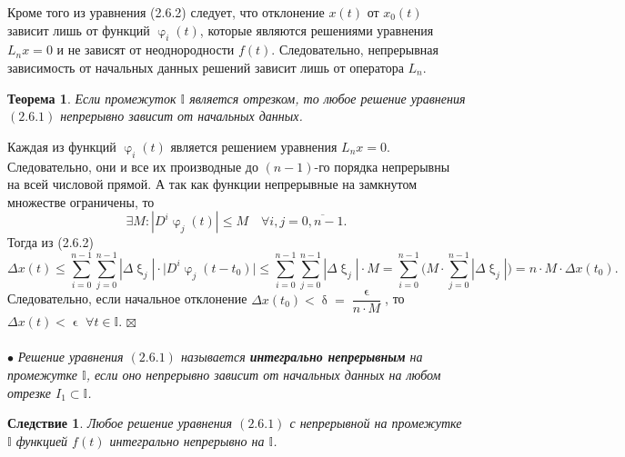 \documentclass[a4paper, 12pt]{report}
\newenvironment{Proof} %
{\par\noindent{$\blacklozenge$}} %
{\hfill$\scriptstyle\boxtimes$}
\newcommand{\I}{\mathbb{I}}
\renewcommand{\delta}{\updelta}
\renewcommand{\varphi}{\upvarphi}
\renewcommand{\xi}{\upxi}
\newtheorem*{theorem}{Теорема}
\newtheorem*{cor}{Следствие}
\begin{document}
Кроме того из уравнения (2.6.2) следует, что отклонение $x(t)$ от $x_0(t)$ зависит лишь от функций $\varphi_i(t)$, которые являются решениями уравнения $L_nx = 0$ и не зависят от неоднородности $f(t)$. Следовательно, непрерывная зависимость от начальных данных решений зависит лишь от оператора $L_n$.
\begin{theorem}
	Если промежуток $\I$ является отрезком, то любое решение уравнения $(2.6.1)$ непрерывно зависит от начальных данных.
\end{theorem}\begin{Proof}
Каждая из функций $\varphi_i(t)$ является решением уравнения $L_nx = 0$. Следовательно, они и все их производные до $(n-1)$-го порядка непрерывны на всей числовой прямой. А так как функции непрерывные на замкнутом множестве ограничены, то $$\exists M : |D^i\varphi_j(t)|\leqslant M\quad \forall i,j = \overline{0, n-1}.$$
Тогда из (2.6.2) $$\Delta x(t) \leqslant\sum_{i = 0}^{n-1}\sum_{j = 0}^{n-1} | \Delta \xi_j|\cdot \Big|D^i\varphi_j(t-t_0)\Big|\leqslant \sum_{i = 0}^{n-1}\sum_{j = 0}^{n-1} | \Delta \xi_j|\cdot M = \sum_{i = 0}^{n-1}\Big(M\cdot \sum_{j = 0}^{n-1} | \Delta \xi_j|\Big) = n\cdot M\cdot \Delta x(t_0).$$
Следовательно, если начальное отклонение $\Delta x(t_0) < \delta = \dfrac{\upvarepsilon}{n\cdot M}$, то $\Delta x(t) < \upvarepsilon$ $\forall t \in \I$.
\end{Proof}\\\\
$\bullet$ \textit{Решение уравнения $(2.6.1)$ называется \textbf{интегрально непрерывным} на промежутке $\I$, если оно непрерывно зависит от начальных данных на любом отрезке $I_1 \subset \I$.}
\begin{cor}
	Любое решение уравнения $(2.6.1)$ с непрерывной на промежутке $\I$ функцией $f(t)$ интегрально непрерывно на $\I$.
\end{cor}
\end{document}
